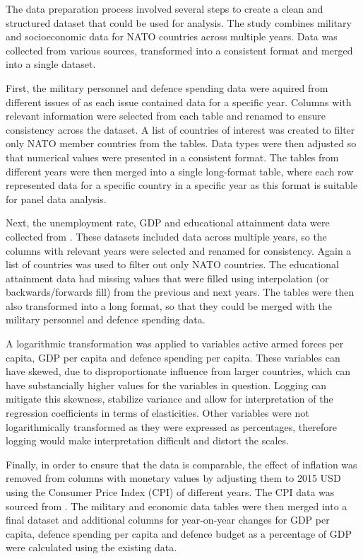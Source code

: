 The data preparation process involved several steps to create a clean and structured 
dataset that could be used for analysis. The study combines military and socioeconomic 
data for NATO countries across multiple years. Data was collected from various sources,
transformed into a consistent format and merged into a single dataset.

First, the military personnel and defence 
spending data were aquired from different issues of \textcite{noauthor_military_balance_nodate} 
as each issue contained data for a specific year. Columns with relevant information were 
selected from each table and renamed to ensure consistency across the dataset. A list of 
countries of interest was created to filter only NATO member countries from the tables.
Data types were then adjusted so that numerical values were presented in a consistent format.
The tables from different years were then merged into a single long-format table, where
each row represented data for a specific country in a specific year as this format is 
suitable for panel data analysis.

Next, the unemployment rate, GDP and educational attainment data were collected from 
\textcite{noauthor_world_bank_nodate}. These datasets included data across multiple years, 
so the columns with relevant years were selected and renamed for consistency. Again a 
list of countries was used to filter out only NATO countries. The educational attainment 
data had missing values that were filled using interpolation (or backwards/forwards fill) from the previous and next 
years. The tables were then also transformed into a long format, so that they could be 
merged with the military personnel and defence spending data.

A logarithmic transformation was applied to variables active armed forces per capita, GDP per capita 
and defence spending per capita. These variables can have skewed, due to disproportionate influence 
from larger countries, which can have substancially higher values for the variables in question. 
Logging can mitigate this skewness, stabilize variance and allow for interpretation of the regression 
coefficients in terms of elasticities. Other variables were not logarithmically transformed as they were 
expressed as percentages, therefore logging would make interpretation difficult and distort the scales.

Finally, in order to ensure that the data is comparable, the effect of inflation was removed 
from columns with monetary values by adjusting them to 2015 USD using the Consumer Price 
Index (CPI) of different years. The CPI data was sourced from \textcite{federal_reserve_bank_of_minneapolis_consumer_nodate}. 
The military and economic data tables were then merged into a final dataset and additional 
columns for year-on-year changes for GDP per capita, defence spending per capita  
and defence budget as a percentage of GDP were calculated using the existing data.

